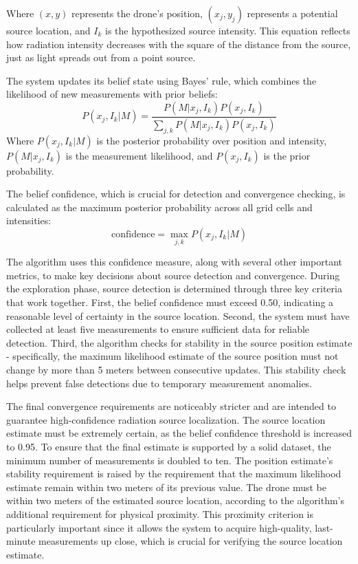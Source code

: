 \documentclass[../report.tex]{subfiles}
\begin{document}
    Where $(x,y)$ represents the drone's position, $(x_j,y_j)$ represents a potential source location, and $I_k$ is the hypothesized source intensity. This equation reflects how 
    radiation intensity decreases with the square of the distance from the source, just as light spreads out from a point source.
    
    The system updates its belief state using Bayes' rule, which combines the likelihood of new measurements with prior beliefs:
    \begin{equation}
        P(x_j, I_k|M) = \frac{P(M|x_j, I_k)P(x_j, I_k)}{\sum_{j,k} P(M|x_j, I_k)P(x_j, I_k)}
    \end{equation}
    Where $P(x_j, I_k|M)$ is the posterior probability over position and intensity, $P(M|x_j,I_k)$ is the measurement likelihood, and $P(x_j,I_k)$ is the prior probability.

    The belief confidence, which is crucial for detection and convergence checking, is calculated as the maximum posterior probability across all grid cells and intensities:
    \begin{equation}
        \text{confidence} = \max_{j,k} P(x_j, I_k|M)
    \end{equation}

    The algorithm uses this confidence measure, along with several other important metrics, to make key decisions about source detection and convergence. During the exploration phase, source detection 
    is determined through three key criteria that work together. First, the belief confidence must exceed 0.50, indicating a reasonable level of certainty in the source location. Second, the system 
    must have collected at least five measurements to ensure sufficient data for reliable detection. Third, the algorithm checks for stability in the source position estimate - specifically, the 
    maximum likelihood estimate of the source position must not change by more than 5 meters between consecutive updates. This stability check helps prevent false detections due to temporary 
    measurement anomalies.
   
    The final convergence requirements are noticeably stricter and are intended to guarantee high-confidence radiation source localization. The source location estimate must be extremely certain, 
    as the belief confidence threshold is increased to 0.95. To ensure that the final estimate is supported by a solid dataset, the minimum number of measurements is doubled to ten. The position 
    estimate's stability requirement is raised by the requirement that the maximum likelihood estimate remain within two meters of its previous value. The drone must be within two meters of the 
    estimated source location, according to the algorithm's additional requirement for physical proximity. This proximity criterion is particularly important since it allows the system to acquire
     high-quality, last-minute measurements up close, which is crucial for verifying the source location estimate.
\end{document}

